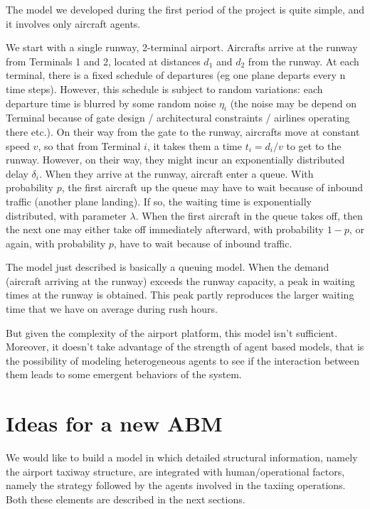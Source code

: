 \documentclass{article}
\begin{document}
The model we developed during the first period of the project is quite simple, and it involves only aircraft agents.

We start with a single runway, 2-terminal airport. Aircrafts arrive at the runway from Terminals 1 and 2, located at distances $d_1$ and $d_2$ from the runway. At each terminal, there is a fixed schedule of departures (eg one plane departs every n time steps). However, this schedule is subject to random variations: each departure time is blurred by some random noise $\eta_i$ (the noise may be depend on Terminal because of gate design / architectural constraints / airlines operating there etc.). On their way from the gate to the runway, aircrafts move at constant speed $v$, so that from Terminal $i$, it takes them a time $t_i = d_i/v$ to get to the runway. However, on their way, they might incur an exponentially distributed delay $\delta_i$. When they arrive at the runway, aircraft enter a queue. With probability $p$, the first aircraft up the queue may have to wait because of inbound traffic (another plane landing). If so, the waiting time is exponentially distributed, with parameter $\lambda$. 
When the first aircraft in the queue takes off, then the next one may either take off immediately afterward, with probability $1-p$, or again, with probability $p$, have to wait because of inbound traffic. 
\smallskip

The model just described is basically a queuing model. When the demand (aircraft arriving at the runway) exceeds the runway capacity, a peak in waiting times at the runway is obtained. This peak partly reproduces the larger waiting time that we have on average during rush hours. 

But given the complexity of the airport platform, this model isn't sufficient. Moreover, it doesn't take advantage of the strength of agent based models, that is the possibility of modeling heterogeneous agents to see if the interaction between them leads to some emergent behaviors of the system.

\section{Ideas for a new ABM}
We would like to build a model in which detailed structural information, namely the airport taxiway structure, are integrated with human/operational factors, namely the strategy followed by the agents involved in the taxiing operations. Both these elements are described in the next sections.
\end{document}
